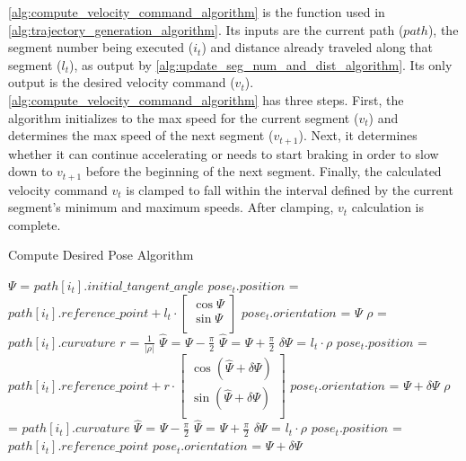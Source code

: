 \autoref{alg:compute_velocity_command_algorithm} is the \ComputeVelocityCommand function used in \autoref{alg:trajectory_generation_algorithm}. Its inputs are the current path ($path$), the segment number being executed ($i_t$) and distance already traveled along that segment ($l_t$), as output by \autoref{alg:update_seg_num_and_dist_algorithm}. Its only output is the desired velocity command ($v_t$). \autoref{alg:compute_velocity_command_algorithm} has three steps. First, the algorithm initializes to the max speed for the current segment ($v_t$) and determines the max speed of the next segment ($v_{t+1}$). Next, it determines whether it can continue accelerating or needs to start braking in order to slow down to $v_{t+1}$ before the beginning of the next segment. Finally, the calculated velocity command $v_t$ is clamped to fall within the interval defined by the current segment's minimum and maximum speeds. After clamping, $v_t$ calculation is complete.

\begin{algorithm}
\caption{Compute Desired Pose Algorithm}
\label{alg:compute_desired_pose_algorithm}
\DontPrintSemicolon


$\Psi$  = $path\left[i_t\right].initial\_tangent\_angle$ \;
{
	{
		$pose_t.position$ = $path\left[i_t\right].reference\_point + l_t \cdot 
			\begin{bmatrix}
				\cos \Psi \\
				\sin \Psi \\
			\end{bmatrix} $ \;
		$pose_t.orientation$  = $\Psi$ \;
	}
	{
		$\rho$ = $path\left[i_t\right].curvature$ \;
		$r$ = $\frac{1}{ | \rho | }$ \;
		{
			$\hat\Psi$ = $\Psi - \frac{\pi}{2}$ \;
		}
		{
			$\hat\Psi$ = $\Psi + \frac{\pi}{2}$ \;
		}
		$\delta\Psi$ = $l_t \cdot \rho$ \;
		$pose_t.position$ = $path\left[i_t\right].reference\_point + r \cdot 
			\begin{bmatrix}
				\cos\left( \hat\Psi + \delta\Psi \right) \\
				\sin\left( \hat\Psi + \delta\Psi \right) \\
			\end{bmatrix} $ \;
		$pose_t.orientation$  = $\Psi + \delta\Psi$ \;
	}
	{
		$\rho$ = $path\left[i_t\right].curvature$ \;
		{
			$\hat\Psi$ = $\Psi - \frac{\pi}{2}$ \;
		}
		{
			$\hat\Psi$ = $\Psi + \frac{\pi}{2}$ \;
		}
		$\delta\Psi$ = $l_t \cdot \rho$ \;
		$pose_t.position$ = $path\left[i_t\right].reference\_point$ \;
		$pose_t.orientation$  = $\Psi + \delta\Psi$ \;
	}
}

\end{algorithm}

